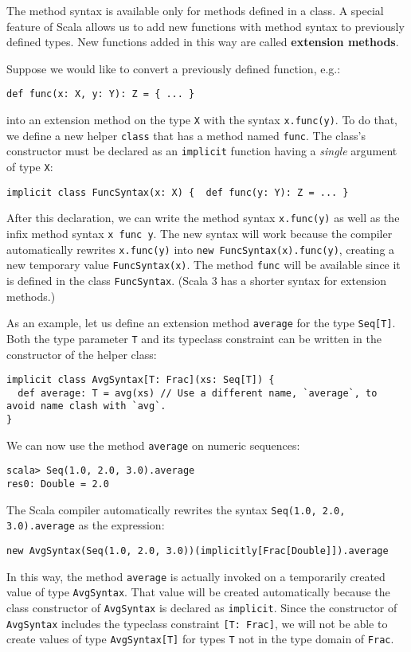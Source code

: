 The method syntax is available only for methods defined in a class.
A special feature of Scala allows us to add new functions with method
syntax to previously defined types. New functions added in this way
are called \textbf{extension methods}. 

Suppose we would like to convert a previously defined function, e.g.:
\begin{lstlisting}
def func(x: X, y: Y): Z = { ... }
\end{lstlisting}
into an extension method on the type \lstinline!X! with the syntax
\lstinline!x.func(y)!. To do that, we define a new helper \lstinline!class!
that has a method named \lstinline!func!. The class\textsf{'}s constructor
must be declared as an \lstinline!implicit! function having a \emph{single}
argument of type \lstinline!X!:
\begin{lstlisting}
implicit class FuncSyntax(x: X) {  def func(y: Y): Z = ... }
\end{lstlisting}
After this declaration, we can write the method syntax \lstinline!x.func(y)!
as well as the infix method syntax \lstinline!x func y!. The new
syntax will work because the compiler automatically rewrites \lstinline!x.func(y)!
into \lstinline!new FuncSyntax(x).func(y)!, creating a new temporary
value \lstinline!FuncSyntax(x)!. The method \lstinline!func! will
be available since it is defined in the class \lstinline!FuncSyntax!.
(Scala 3 has a shorter syntax for extension methods.)

As an example, let us define an extension method \lstinline!average!
for the type \lstinline!Seq[T]!. Both the type parameter \lstinline!T!
and its typeclass constraint can be written in the constructor of
the helper class:
\begin{lstlisting}
implicit class AvgSyntax[T: Frac](xs: Seq[T]) {
  def average: T = avg(xs) // Use a different name, `average`, to avoid name clash with `avg`.
}
\end{lstlisting}
We can now use the method \lstinline!average! on numeric sequences:
\begin{lstlisting}
scala> Seq(1.0, 2.0, 3.0).average
res0: Double = 2.0
\end{lstlisting}
The Scala compiler automatically rewrites the syntax \lstinline!Seq(1.0, 2.0, 3.0).average!
as the expression:
\begin{lstlisting}
new AvgSyntax(Seq(1.0, 2.0, 3.0))(implicitly[Frac[Double]]).average
\end{lstlisting}
In this way, the method \lstinline!average! is actually invoked on
a temporarily created value of type \lstinline!AvgSyntax!. That value
will be created automatically because the class constructor of \lstinline!AvgSyntax!
is declared as \lstinline!implicit!. Since the constructor of \lstinline!AvgSyntax!
includes the typeclass constraint \lstinline![T: Frac]!, we will
not be able to create values of type \lstinline!AvgSyntax[T]! for
types \lstinline!T! not in the type domain of \lstinline!Frac!.

